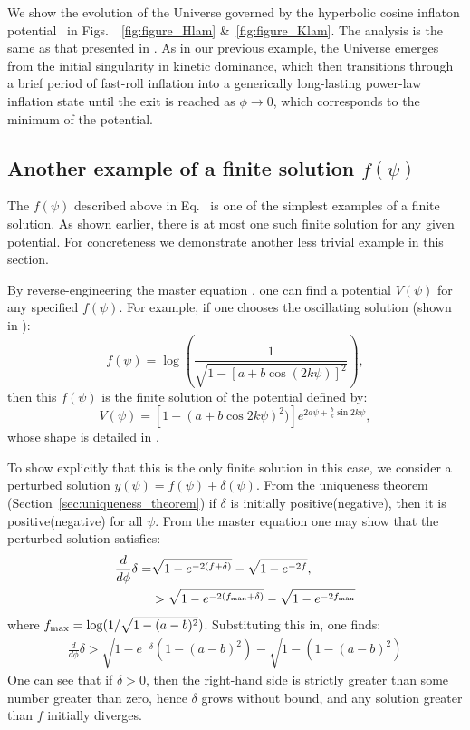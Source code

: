 We show the evolution of the Universe governed by the hyperbolic
cosine inflaton potential~ in
Figs.\ ~\ref{fig:figure_Hlam} \&~\ref{fig:figure_Klam}. The analysis
is the same as that presented in .
As in our previous example, the Universe emerges from the initial
singularity in kinetic dominance, which then transitions through a
brief period of fast-roll inflation into a generically long-lasting
power-law inflation state until the exit is reached as
$\phi\rightarrow0$, which corresponds to the minimum of the potential.  

\subsection{Another example of a finite solution $f(\psi)$}
The $f(\psi)$ described above in Eq.\  is
one of the simplest examples of a finite solution. As shown earlier,
there is at most one such finite solution for any given potential. For
concreteness we demonstrate another less trivial example in this
section.

By reverse-engineering the master equation , one
can find a potential $V(\psi)$ for any specified $f(\psi)$. For
example, if one chooses the oscillating solution (shown in
):
%
\begin{equation}
  f(\psi) = \log\left( \frac{1}{\sqrt{1-[a+b\cos(2k\psi)]^2}}\right),
  \label{eqn:uf_example}
\end{equation}
%
then this $f(\psi)$ is the finite solution of the potential defined by:
%
\begin{equation}
	V(\psi)
    =
    \left[ 1-(a+b \cos2k\psi)^2) \right]
    e^{2 a \psi +\frac{b}{k} \sin 2k\psi},
    \label{eqn:Vphi_uf_example}
\end{equation}
whose shape is detailed in .
%

To show explicitly that this is the only finite solution in this case,
we consider a perturbed solution $y(\psi) = f(\psi)+\delta(\psi)$.
From the uniqueness theorem (Section~\ref{sec:uniqueness_theorem}) if
$\delta$ is initially positive(negative), then it is
positive(negative) for all $\psi$. From the master equation
 one may show that the perturbed solution
satisfies:
%
\begin{align}
  \frac{d}{d\phi}\delta 
  =& 
  \sqrt{1-e^{-2(f+\delta)}} -\sqrt{1-e^{-2f}}, 
  \label{eqn:perturb}
  \\
  &>
  \sqrt{1-e^{-2(f_\mathrm{max}+\delta)}} -\sqrt{1-e^{-2f_\mathrm{max}}}
\end{align}
%
where $f_\mathrm{max} = \log(1/\sqrt{1-(a-b)^2})$. Substituting this in, one finds:
%
\begin{align}
  \frac{d}{d\phi}\delta 
  > 
  \sqrt{1-e^{-\delta}({1-(a-b)^2})} - \sqrt{1-({1-(a-b)^2})}
\end{align}
%
One can see that if $\delta>0$, then the right-hand side is strictly
greater than some number greater than zero, hence $\delta$ grows
without bound, and any solution greater than $f$ initially diverges. 

